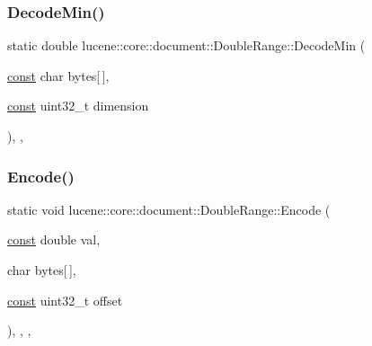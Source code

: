 \mbox{\label{classlucene_1_1core_1_1document_1_1DoubleRange_a736e2ceb6f00b32f7867ec702da059b4}} 
\subsubsection{\texorpdfstring{Decode\+Min()}{DecodeMin()}}
{\footnotesize\ttfamily static double lucene\+::core\+::document\+::\+Double\+Range\+::\+Decode\+Min (\begin{DoxyParamCaption}\item[{\mbox{\hyperlink{ZlibCrc32_8h_a2c212835823e3c54a8ab6d95c652660e}{const}} char}]{bytes\mbox{[}$\,$\mbox{]},  }\item[{\mbox{\hyperlink{ZlibCrc32_8h_a2c212835823e3c54a8ab6d95c652660e}{const}} uint32\+\_\+t}]{dimension }\end{DoxyParamCaption})\hspace{0.3cm}{\ttfamily [inline]}, {\ttfamily [static]}, {\ttfamily [noexcept]}}

\mbox{\label{classlucene_1_1core_1_1document_1_1DoubleRange_a2763582d3f37e3a080fc1e2afe48277c}} 
\subsubsection{\texorpdfstring{Encode()}{Encode()}}
{\footnotesize\ttfamily static void lucene\+::core\+::document\+::\+Double\+Range\+::\+Encode (\begin{DoxyParamCaption}\item[{\mbox{\hyperlink{ZlibCrc32_8h_a2c212835823e3c54a8ab6d95c652660e}{const}} double}]{val,  }\item[{char}]{bytes\mbox{[}$\,$\mbox{]},  }\item[{\mbox{\hyperlink{ZlibCrc32_8h_a2c212835823e3c54a8ab6d95c652660e}{const}} uint32\+\_\+t}]{offset }\end{DoxyParamCaption})\hspace{0.3cm}{\ttfamily [inline]}, {\ttfamily [static]}, {\ttfamily [private]}, {\ttfamily [noexcept]}}

